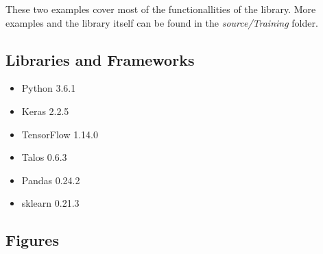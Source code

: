 These two examples cover most of the functionallities of the library. 
More examples and the library itself can be found in the \textit{source/Training} folder.

\subsection{Libraries and Frameworks}
\begin{itemize}
	\item Python 3.6.1
	\item Keras 2.2.5
	\item TensorFlow 1.14.0
	\item Talos 0.6.3
	\item Pandas 0.24.2
	\item sklearn 0.21.3
\end{itemize}

\subsection{Figures}
   
